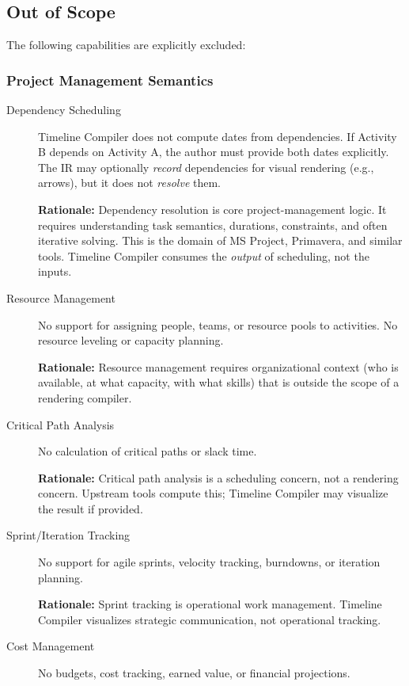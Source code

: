 \subsection{Out of Scope}

The following capabilities are explicitly excluded:

\subsubsection{Project Management Semantics}

\begin{description}
  \item[Dependency Scheduling] Timeline Compiler does not compute dates from dependencies. If Activity B depends on Activity A, the author must provide both dates explicitly. The IR may optionally \emph{record} dependencies for visual rendering (e.g., arrows), but it does not \emph{resolve} them.
  
  \textbf{Rationale:} Dependency resolution is core project-management logic. It requires understanding task semantics, durations, constraints, and often iterative solving. This is the domain of MS Project, Primavera, and similar tools. Timeline Compiler consumes the \emph{output} of scheduling, not the inputs.
  
  \item[Resource Management] No support for assigning people, teams, or resource pools to activities. No resource leveling or capacity planning.
  
  \textbf{Rationale:} Resource management requires organizational context (who is available, at what capacity, with what skills) that is outside the scope of a rendering compiler.
  
  \item[Critical Path Analysis] No calculation of critical paths or slack time.
  
  \textbf{Rationale:} Critical path analysis is a scheduling concern, not a rendering concern. Upstream tools compute this; Timeline Compiler may visualize the result if provided.
  
  \item[Sprint/Iteration Tracking] No support for agile sprints, velocity tracking, burndowns, or iteration planning.
  
  \textbf{Rationale:} Sprint tracking is operational work management. Timeline Compiler visualizes strategic communication, not operational tracking.
  
  \item[Cost Management] No budgets, cost tracking, earned value, or financial projections.
  

\end{description}
